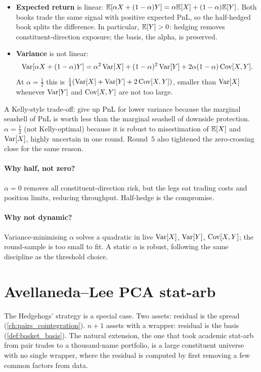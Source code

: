 \begin{itemize}
  \item \textbf{Expected return} is linear:
  $\mathbb{E}[\alpha X + (1 - \alpha) Y] = \alpha \mathbb{E}[X] + (1-\alpha) \mathbb{E}[Y]$.
  Both books trade the same signal with positive expected PnL, so
  the half-hedged book splits the difference. In particular,
  $\mathbb{E}[Y] > 0$: hedging removes constituent-direction exposure;
  the basis, the alpha, is preserved.
  \item \textbf{Variance} is not linear:
  \begin{equation}
    \operatorname{Var}[\alpha X + (1-\alpha) Y]
    = \alpha^2 \operatorname{Var}[X] + (1-\alpha)^2 \operatorname{Var}[Y]
    + 2\alpha(1-\alpha)\operatorname{Cov}[X, Y].
    \label{eq:half_hedge_variance}
  \end{equation}
  At $\alpha = \tfrac{1}{2}$ this is
  $\tfrac{1}{4}(\operatorname{Var}[X] + \operatorname{Var}[Y] + 2\operatorname{Cov}[X, Y])$, smaller than
  $\operatorname{Var}[X]$ whenever $\operatorname{Var}[Y]$ and $\operatorname{Cov}[X, Y]$ are not too large.
\end{itemize}

A Kelly-style trade-off: give up PnL for lower variance because
the marginal seashell of PnL is worth less than the marginal
seashell of downside protection. $\alpha = \tfrac{1}{2}$ (not
Kelly-optimal) because it is robust to misestimation of $\mathbb{E}[X]$
and $\operatorname{Var}[X]$, highly uncertain in one round. Round~$5$ also
tightened the zero-crossing close for the same reason.

\paragraph{Why half, not zero?} $\alpha = 0$ removes all
constituent-direction risk, but the legs eat trading costs and
position limits, reducing throughput. Half-hedge is the compromise.

\paragraph{Why not dynamic?} Variance-minimising $\alpha$ solves a
quadratic in live $\operatorname{Var}[X]$, $\operatorname{Var}[Y]$, $\operatorname{Cov}[X, Y]$; the
round-sample is too small to fit. A static $\alpha$ is robust,
following the same discipline as the threshold choice.

\section{Avellaneda--Lee PCA stat-arb}
\label{sec:ch11_avellaneda_lee}

The Hedgehogs' strategy is a special case. Two assets: residual is
the spread (\cref{ch:pairs_cointegration}). $n+1$ assets with a
wrapper: residual is the basis (\cref{def:basket_basis}). The
natural extension, the one that took academic stat-arb from
pair trades to a thousand-name portfolio, is a large
constituent universe with no single wrapper, where the residual
is computed by first removing a few common factors from data.

